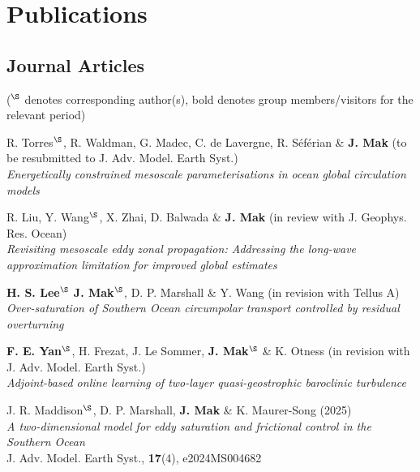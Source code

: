 \documentclass[letterpaper]{article}
\renewenvironment{itemize}{
  \begin{list}{}{
    \setlength{\leftmargin}{1.5em}
  }
}{
  \end{list}
}
\begin{document}
\section*{Publications}
\subsection*{Journal Articles}

(${}^\S$ denotes corresponding author(s), bold denotes group members/visitors for the relevant period)

\begin{itemize}


\item[*] R. Torres$^{\S}$, R. Waldman, G. Madec, C. de Lavergne, R. S\'ef\'erian \& \textbf{J. Mak} (to be resubmitted to J. Adv. Model. Earth Syst.)\\
\textit{Energetically constrained mesoscale parameterisations in ocean global circulation models}

\item[*] R. Liu, Y. Wang$^{\S}$, X. Zhai, D. Balwada \& \textbf{J. Mak} (in review with J. Geophys. Res. Ocean)\\
\textit{Revisiting mesoscale eddy zonal propagation: Addressing the long-wave approximation limitation for improved global estimates}

\item[*] \textbf{H. S. Lee}$^{\S}$ \textbf{J. Mak}$^{\S}$, D. P. Marshall \& Y. Wang (in revision with Tellus A)\\
\textit{Over-saturation of Southern Ocean circumpolar transport controlled by residual overturning}

\item[*] \textbf{F. E. Yan}$^{\S}$, H. Frezat, J. Le Sommer, \textbf{J. Mak}$^{\S}$ \& K. Otness (in revision with J. Adv. Model. Earth Syst.)\\
\textit{Adjoint-based online learning of two-layer quasi-geostrophic baroclinic turbulence}

\item[25.] J. R. Maddison$^{\S}$, D. P. Marshall, \textbf{J. Mak} \& K. Maurer-Song (2025)\\
\textit{A two-dimensional model for eddy saturation and frictional control in the Southern Ocean}\\
J. Adv. Model. Earth Syst., \textbf{17}(4), e2024MS004682


\end{itemize}
\end{document}
